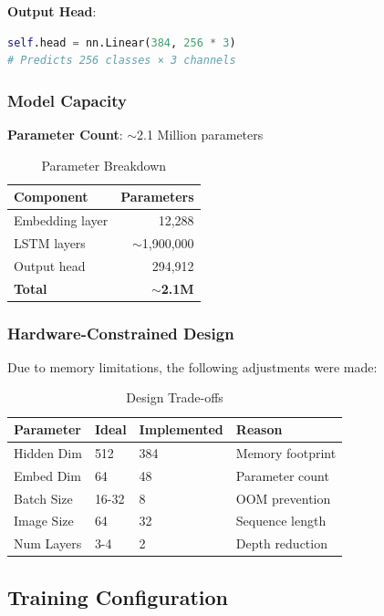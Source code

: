 \documentclass[12pt,a4paper]{article}
\begin{document}
\textbf{Output Head}:
\begin{lstlisting}[language=Python, caption=Output Layer]
self.head = nn.Linear(384, 256 * 3)
# Predicts 256 classes × 3 channels
\end{lstlisting}

\subsubsection{Model Capacity}

\textbf{Parameter Count}: $\sim$2.1 Million parameters

\begin{table}[H]
\centering
\caption{Parameter Breakdown}
\begin{tabular}{@{}lr@{}}
\toprule
\textbf{Component} & \textbf{Parameters} \\ \midrule
Embedding layer & 12,288 \\
LSTM layers & $\sim$1,900,000 \\
Output head & 294,912 \\ \midrule
\textbf{Total} & \textbf{$\sim$2.1M} \\ \bottomrule
\end{tabular}
\end{table}

\subsubsection{Hardware-Constrained Design}

Due to memory limitations, the following adjustments were made:

\begin{table}[H]
\centering
\caption{Design Trade-offs}
\begin{tabular}{@{}llll@{}}
\toprule
\textbf{Parameter} & \textbf{Ideal} & \textbf{Implemented} & \textbf{Reason} \\ \midrule
Hidden Dim & 512 & 384 & Memory footprint \\
Embed Dim & 64 & 48 & Parameter count \\
Batch Size & 16-32 & 8 & OOM prevention \\
Image Size & 64 & 32 & Sequence length \\
Num Layers & 3-4 & 2 & Depth reduction \\ \bottomrule
\end{tabular}
\end{table}

\subsection{Training Configuration}
\end{document}
